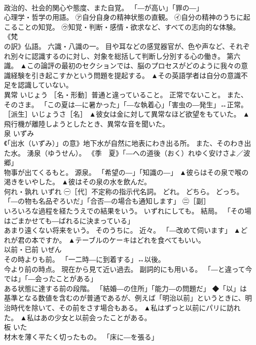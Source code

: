 \documentclass[8pt]{extreport}
\begin{document}
\begin{CJK}{UTF8}{min}
\\	政治的、社会的関心や態度、また自覚。 「―が高い」「罪の―」 
\\	心理学・哲学の用語。 ㋐自分自身の精神状態の直観。 ㋑自分の精神のうちに起こることの知覚。 ㋒知覚・判断・感情・欲求など、すべての志向的な体験。 
\\	《梵
\\	の訳》仏語。 六識・八識の一。 目や耳などの感覚器官が、色や声など、それぞれ別々に認識するのに対し、対象を総括して判断し分別する心の働き。 第六識。	▲この論評の最初のセクションでは、脳のプロセスがどのように我々の意識経験を引き起こすかという問題を提起する。 ▲その英語学者は自分の意識不足を認識していない。
\\	異常	いじょう	［名・形動］普通と違っていること。 正常でないこと。 また、そのさま。 「この夏は―に暑かった」「―な執着心」「害虫の―発生」↔正常。 ［派生］いじょうさ［名］	▲彼女は金に対して異常なほど欲望をもていた。 ▲飛行機が離陸しようとしたとき、異常な音を聞いた。
\\	泉	いずみ	
\\	《「出水（いずみ）」の意》地下水が自然に地表にわき出る所。 また、そのわき出た水。 湧泉（ゆうせん）。 《季　夏》「―への道後（おく）れゆく安けさよ／波郷」 
\\	物事が出てくるもと。 源泉。 「希望の―」「知識の―」	▲彼らはその泉で喉の渇きをいやした。 ▲彼はその泉の水を飲んだ。
\\	何れ・孰れ	いずれ	㊀［代］不定称の指示代名詞。 どれ。 どちら。 どっち。 「―の物も名品ぞろいだ」「合否―の場合も通知します」 ㊁［副］ 
\\	いろいろな過程を経たうえでの結果をいう。 いずれにしても。 結局。 「その場はごまかせても―ばれるに決まっている」 
\\	あまり遠くない将来をいう。 そのうちに。 近々。 「―改めて伺います」	▲どれが君の本ですか。 ▲テーブルのケーキはどれを食べてもいい。
\\	以前・已前	いぜん	
\\	その時よりも前。 「一二時―に到着する」↔以後。 
\\	今より前の時点。 現在から見て近い過去。 副詞的にも用いる。 「―と違って今では」「―会ったことがある」 
\\	ある状態に達する前の段階。 「結婚―の住所」「能力―の問題だ」 ◆「以」は基準となる数値を含むのが普通であるが、例えば「明治以前」というときに、明治時代を除いて、その前をさす場合もある。	▲私はずっと以前にパリに訪れた。 ▲私はあの少女と以前会ったことがある。
\\	板	いた	
\\	材木を薄く平たく切ったもの。 「床に―を張る」 

\end{CJK}
\end{document}
